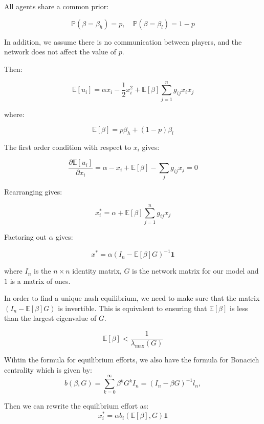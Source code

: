 \documentclass[12pt]{article}
\begin{document}
All agents share a common prior:

\[
\mathbb{P}(\beta = \beta_h) = p, \quad \mathbb{P}(\beta = \beta_l) = 1-p
\]

In addition, we assume there is no communication between players, and the network does not affect the value of $p$.

Then:

\[
\mathbb{E}[u_i] = \alpha x_i - \frac{1}{2}x_i^2 + \mathbb{E}[\beta] \sum_{j=1}^{n} g_{ij} x_i x_j
\]

where:

\[
\mathbb{E}[\beta] = p \beta_h + (1-p) \beta_l
\]

The first order condition with respect to $x_i$ gives:

\[
\frac{\partial \mathbb{E}[u_i]}{\partial x_i}= \alpha - x_i + \mathbb{E}[\beta] - \sum_{j} g_{ij} x_j = 0
\]

\vspace{1em}

Rearranging gives:

\[
x_i^* = \alpha + \mathbb{E}[\beta] \sum_{j=1}^{n} g_{ij} x_j
\]

\vspace{1em}

Factoring out $\alpha$ gives:

\[
x^* = \alpha (I_n - \mathbb{E}[\beta] G)^{-1} \mathbf{1}
\]

where $I_n$ is the $n \times n$ identity matrix, $G$ is the network matrix for our model and $1$ is a matrix of ones.

\vspace{1em}

In order to find a unique nash equilibrium, we need to make sure that the matrix $(I_n - \mathbb{E}[\beta] G)$ is invertible. This is equivalent to ensuring that $\mathbb{E}[\beta]$ is less than the largest eigenvalue of $G$.

\[
\mathbb{E}[\beta] < \frac{1}{\lambda_{\text{max}}(G)}
\]

Wihtin the formula for equilibrium efforts, we also have the formula for Bonacich centrality which is given by:
\[
b(\beta, G) = \sum_{k=0}^{\infty} \beta^k G^k I_n = (I_n - \beta G)^{-1} l_n,
\]
\vspace{1em}

Then we can rewrite the equilibrium effort as:
\[
x_i^* = \alpha b_i(\mathbb{E}[\beta], G) \mathbf{1}
\]
\end{document}
